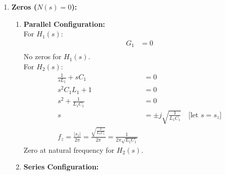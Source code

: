 \begin{enumerate}
\begin{enumerate}
\begin{tabularx}{\linewidth}{|X|X|X|X|}
          Natural & \(s^2\) & \(2 \zeta \omega_n s\) & \(\omega_n^2\) \\ \hline
        \end{tabularx}\\ \\
        We get,
        \begin{enumerate}
          \item Natural Frequency:
            \begin{align*}
              \omega_n = \sqrt{\frac{1}{L_1 C_1}} \\
              f_p = \frac{\omega_n}{2\pi} = \frac{1}{2\pi \sqrt{L_1 C_1}}
            \end{align*}
          \item Damping Ratio:
            \[
              2 \zeta \omega_n = \frac{1}{L_1 G_1} \implies \zeta = \frac{1}{2 L_1 G_1 \omega_n} = \frac{1}{2 G_1} \sqrt{\frac{C_1}{L_1}}
            \]
          \item Q Factor:
            \[
              Q = \frac{1}{2\zeta} = G_1 \sqrt{\frac{L_1}{C_1}}
            \]
        \end{enumerate}
    \end{enumerate}
  \item \textbf{Zeros (\(N(s) = 0\)):} \\
    \begin{enumerate}
      \item \textbf{Parallel Configuration:}\\
        For \(H_1(s)\):
          \begin{align*}
            G_1 &= 0 \\
          \end{align*}
          No zeros for \(H_1(s)\). \\
        For \(H_2(s)\):
          \begin{align*}
            \frac{1}{sL_1} + sC_1 &= 0 \\
            s^2 C_1 L_1 + 1 &= 0 \\
            s^2 + \frac{1}{L_1 C_1} &= 0 \\
            s &= \pm j\sqrt{\frac{1}{L_1 C_1}} \quad \text{[let \(s = s_z\)]} \\
            \boxed{f_z = \frac{|s_z|}{2\pi} = \frac{\sqrt{\frac{1}{L_1 C_1}}}{2\pi} = \frac{1}{2\pi \sqrt{L_1 C_1}}}
          \end{align*}
          Zero at natural frequency for \(H_2(s)\).
        \item \textbf{Series Configuration:}\\

\end{enumerate}
\end{enumerate}
